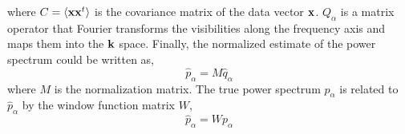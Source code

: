 \documentclass[twocolumn]{emulateapj}
\begin{document}
    where $C = \langle \bold x \bold x^{t} \rangle$ is the covariance matrix of the data vector $\bold x$. $Q_{\alpha}$ is a matrix operator that Fourier transforms the visibilities along the frequency axis and maps them into the $\bold k$ space. Finally, the normalized estimate of the power spectrum could be written as,  
    \begin{equation}
    \hat p_{\alpha} = M \hat q_{\alpha} 
    \label{eq17}
    \end{equation} 
    where $M$ is the normalization matrix.
 The true power spectrum $p_{\alpha}$ is related to $\hat p_{\alpha}$  by the window function matrix $W$, 
    \begin{equation}
    \hat p_{\alpha} = W p_{\alpha}
    \label{eq18}
    \end{equation} 
    
    
    
     
\end{document}
